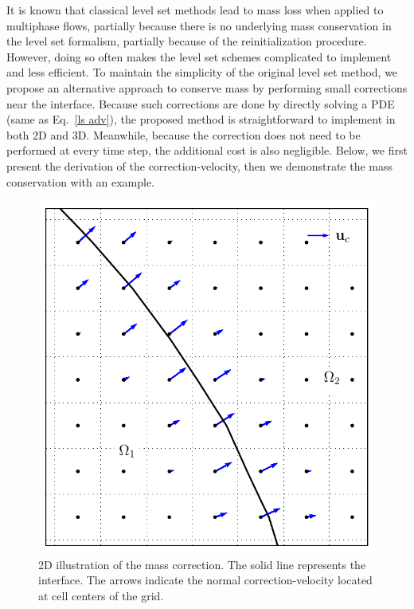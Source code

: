 It is known that classical level set methods lead to mass loss when applied to multiphase flows, partially because there is no underlying mass conservation in the level set formalism, partially because of the reinitialization procedure.  However, doing so often makes the level set schemes complicated to implement and less efficient. To maintain the simplicity of the original level set method, we propose an alternative approach to conserve mass by performing small corrections near the interface. Because such corrections are done by directly solving a PDE (same as Eq.\ \eqref{ls adv}), the proposed method is straightforward to implement in both 2D and 3D. Meanwhile, because the correction does not need to be performed at every time step, the additional cost is also negligible. Below, we first present the derivation of the correction-velocity, then we demonstrate the mass conservation with an example.


\begin{figure}[t!]
\centering
  \includegraphics[width=.5\columnwidth]{Figures/mc.pdf}
   \caption{2D illustration of the mass correction. The solid line represents the interface. The arrows indicate the normal correction-velocity located at cell centers of the grid.}
   \label{fig:mc sketch}
\end{figure}


